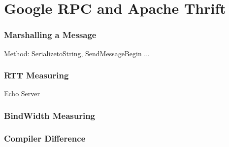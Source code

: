 \documentclass{beamer}
\begin{document}
\section{Google RPC and Apache Thrift}
    \begin{frame}
        \frametitle{Marshalling a Message}
        Method: SerializetoString, SendMessageBegin ... 
     
    \end{frame}
    \begin{frame}
        \frametitle{RTT Measuring}
        Echo Server

     
    \end{frame}
    \begin{frame}
        \frametitle{BindWidth Measuring}
        

     
    \end{frame}
    \begin{frame}
        \frametitle{Compiler Difference}
        

     
    \end{frame}
    
\end{document}
